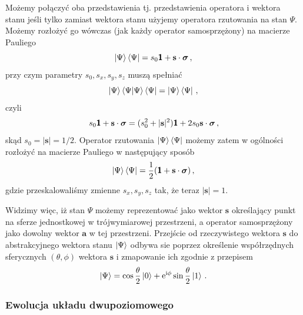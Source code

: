 \documentclass{myclass}
\begin{document}
Możemy połączyć oba przedstawienia tj. przedstawienia operatora i wektora stanu jeśli tylko zamiast
wektora stanu użyjemy operatora rzutowania na stan \(\Psi\). Możemy rozłożyć go wówczas (jak każdy
operator samosprzężony) na macierze Pauliego
\begin{equation*}
    \ket{\Psi}\bra{\Psi} = s_0\boldsymbol{\mathsf{1}} + \mathbf{s}\cdot\boldsymbol{\sigma}\,,
\end{equation*}
przy czym parametry \(s_0,s_x,s_y,s_z\) muszą spełniać
\begin{equation*}
    \ket{\Psi}\bra{\Psi}\ket{\Psi}\bra{\Psi} = \ket{\Psi}\bra{\Psi}\,,
\end{equation*}
czyli
\begin{equation*}
    s_0\boldsymbol{\mathsf{1}} + \mathbf{s}\cdot\boldsymbol{\sigma} = (s_0^2 + |\mathbf{s}|^2)\boldsymbol{\mathsf{1}} + 2s_0\mathbf{s}\cdot\boldsymbol{\sigma}\,,
\end{equation*}
skąd \(s_0 = |\mathbf{s}| = 1/2\). Operator rzutowania \(\ket{\Psi}\bra{\Psi}\) możemy zatem w
ogólności rozłożyć na macierze Pauliego w następujący sposób
\begin{equation*}
    \ket{\Psi}\bra{\Psi} = \frac{1}{2}(\boldsymbol{\mathsf{1}} + \mathbf{s}\cdot\boldsymbol{\sigma})\,,
\end{equation*}
gdzie przeskalowaliśmy zmienne \(s_x,s_y,s_z\) tak, że teraz \(|\mathbf{s}| = 1\).

Widzimy więc, iż stan \(\Psi\) możemy reprezentować jako wektor \(\mathbf{s}\) określający punkt na
sferze jednostkowej w trójwymiarowej przestrzeni, a operator samosprzężony jako dowolny wektor
\(\mathbf{a}\) w tej przestrzeni. Przejście od rzeczywistego wektora \(\mathbf{s}\) do
abstrakcyjnego wektora stanu \(\ket{\Psi}\) odbywa sie poprzez określenie współrzędnych sferycznych
\((\theta,\phi)\) wektora \(\mathbf{s}\) i zmapowanie ich zgodnie z przepisem
\begin{equation*}
    \ket{\Psi} = \cos\frac{\theta}{2}\ket{0} + \mathrm{e}^{\mathrm{i}\phi}\sin\frac{\theta}{2}\ket{1}\,.
\end{equation*}


\subsubsection{Ewolucja układu dwupoziomowego}
\end{document}
